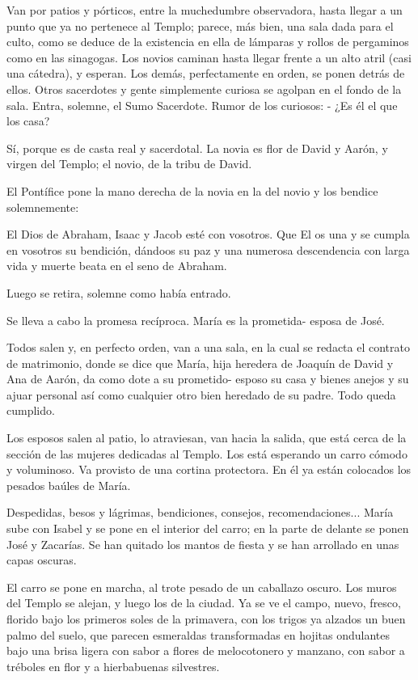 \documentclass[12pt, twoside, openright]{book} %
\begin{document}
Van por patios y pórticos, entre la muchedumbre observadora, hasta llegar a un punto que ya no pertenece al Templo; parece, más bien, una sala dada para el culto, como se deduce de la existencia en ella de lámparas y rollos de pergaminos como en las sinagogas. Los novios caminan hasta llegar frente a un alto atril (casi una cátedra), y esperan. Los demás, perfectamente en orden, se ponen detrás de ellos. Otros sacerdotes y gente simplemente curiosa se agolpan en el fondo de la sala. Entra, solemne, el Sumo Sacerdote. Rumor de los curiosos: - ¿Es él el que los casa? 

Sí, porque es de casta real y sacerdotal. La novia es flor de David y Aarón, y virgen del Templo; el novio, de la tribu de David. 

El Pontífice pone la mano derecha de la novia en la del novio y los bendice solemnemente: 

El Dios de Abraham, Isaac y Jacob esté con vosotros. Que El os una y se cumpla en vosotros su bendición, dándoos su paz y una numerosa descendencia con larga vida y muerte beata en el seno de Abraham. 

Luego se retira, solemne como había entrado. 

Se lleva a cabo la promesa recíproca. María es la prometida- esposa de José. 

Todos salen y, en perfecto orden, van a una sala, en la cual se redacta el contrato de matrimonio, donde se dice que María, hija heredera de Joaquín de David y Ana de Aarón, da como dote a su prometido- esposo su casa y bienes anejos y su ajuar personal así como cualquier otro bien heredado de su padre. Todo queda cumplido. 

Los esposos salen al patio, lo atraviesan, van hacia la salida, que está cerca de la sección de las mujeres dedicadas al Templo. Los está esperando un carro cómodo y voluminoso. Va provisto de una cortina protectora. En él ya están colocados los pesados baúles de María. 

Despedidas, besos y lágrimas, bendiciones, consejos, recomendaciones... María sube con Isabel y se pone en el interior del carro; en la parte de delante se ponen José y Zacarías. Se han quitado los mantos de fiesta y se han arrollado en unas capas oscuras. 

El carro se pone en marcha, al trote pesado de un caballazo oscuro. Los muros del Templo se alejan, y luego los de la ciudad. Ya se ve el campo, nuevo, fresco, florido bajo los primeros soles de la primavera, con los trigos ya alzados un buen palmo del suelo, que parecen esmeraldas transformadas en hojitas ondulantes bajo una brisa ligera con sabor a flores de melocotonero y manzano, con sabor a tréboles en flor y a hierbabuenas silvestres. 
\end{document}
